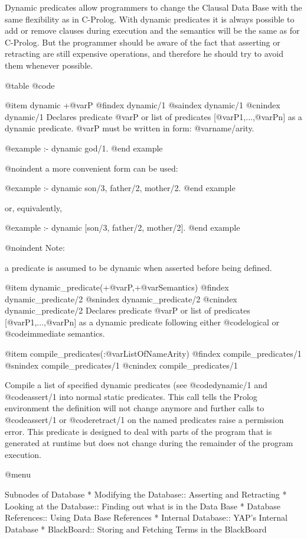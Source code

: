 {{{{{Dynamic predicates allow programmers to change the Clausal Data Base with
the same flexibility as in C-Prolog. With dynamic predicates it is
always possible to add or remove clauses during execution and the
semantics will be the same as for C-Prolog. But the programmer should be
aware of the fact that asserting or retracting are still expensive operations, 
and therefore he should try to avoid them whenever possible.

@table @code

@item dynamic +@var{P}
@findex dynamic/1
@saindex dynamic/1
@cnindex dynamic/1
Declares predicate @var{P} or list of predicates [@var{P1},...,@var{Pn}]
as a dynamic predicate. @var{P} must be written in form:
@var{name/arity}.

@example
:- dynamic god/1.
@end example

@noindent 
a more convenient form can be used:

@example
:- dynamic son/3, father/2, mother/2.
@end example

or, equivalently,

@example
:- dynamic [son/3, father/2, mother/2].
@end example

@noindent
Note:

a predicate is assumed to be dynamic when 
asserted before being defined.

@item dynamic_predicate(+@var{P},+@var{Semantics})
@findex dynamic_predicate/2
@snindex dynamic_predicate/2
@cnindex dynamic_predicate/2
Declares predicate @var{P} or list of predicates [@var{P1},...,@var{Pn}]
as a dynamic predicate following either @code{logical} or
@code{immediate} semantics.
               
@item compile_predicates(:@var{ListOfNameArity})
@findex compile_predicates/1
@snindex compile_predicates/1
@cnindex compile_predicates/1

Compile a list of specified dynamic predicates (see @code{dynamic/1} and
@code{assert/1} into normal static predicates. This call tells the
Prolog environment the definition will not change anymore and further
calls to @code{assert/1} or @code{retract/1} on the named predicates
raise a permission error. This predicate is designed to deal with parts
of the program that is generated at runtime but does not change during
the remainder of the program execution.

@menu

Subnodes of Database
* Modifying the Database:: Asserting and Retracting
* Looking at the Database:: Finding out what is in the Data Base
* Database References:: Using Data Base References
* Internal Database:: YAP's Internal Database
* BlackBoard:: Storing and Fetching Terms in the BlackBoard

}}}}}
